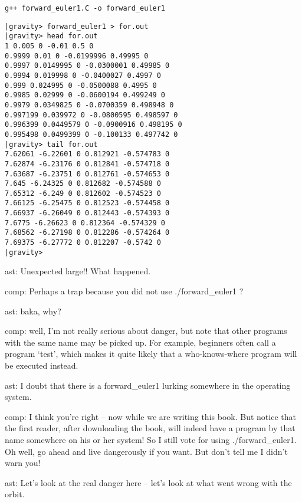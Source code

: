\documentclass{book}
\def\code#1{{\small}}
\begin{document}
\code{forward_euler1.C}

\begin{small}
\begin{verbatim}
g++ forward_euler1.C -o forward_euler1
\end{verbatim}
\end{small}

\begin{small}
\begin{verbatim}
|gravity> forward_euler1 > for.out
|gravity> head for.out
1 0.005 0 -0.01 0.5 0
0.9999 0.01 0 -0.0199996 0.49995 0
0.9997 0.0149995 0 -0.0300001 0.49985 0
0.9994 0.019998 0 -0.0400027 0.4997 0
0.999 0.024995 0 -0.0500088 0.4995 0
0.9985 0.02999 0 -0.0600194 0.499249 0
0.9979 0.0349825 0 -0.0700359 0.498948 0
0.997199 0.039972 0 -0.0800595 0.498597 0
0.996399 0.0449579 0 -0.0900916 0.498195 0
0.995498 0.0499399 0 -0.100133 0.497742 0
|gravity> tail for.out
7.62061 -6.22601 0 0.812921 -0.574783 0
7.62874 -6.23176 0 0.812841 -0.574718 0
7.63687 -6.23751 0 0.812761 -0.574653 0
7.645 -6.24325 0 0.812682 -0.574588 0
7.65312 -6.249 0 0.812602 -0.574523 0
7.66125 -6.25475 0 0.812523 -0.574458 0
7.66937 -6.26049 0 0.812443 -0.574393 0
7.6775 -6.26623 0 0.812364 -0.574329 0
7.68562 -6.27198 0 0.812286 -0.574264 0
7.69375 -6.27772 0 0.812207 -0.5742 0
|gravity>
\end{verbatim}
\end{small}

ast: Unexpected large!! What happened.

comp: Perhaps a trap because you did not use ./forward\_euler1 ?

ast: baka, why?

comp: well, I'm not really serious about danger, but note that other
programs with the same name may be picked up.  For example, beginners
often call a program `test', which makes it quite likely that a
who-knows-where program will be executed instead.

ast: I doubt that there is a forward\_euler1 lurking somewhere in the
operating system.

comp: I think you're right -- now while we are writing this book.  But
notice that the first reader, after downloading the book, will indeed
have a program by that name somewhere on his or her system!  So I
still vote for using ./forward\_euler1.  Oh well, go ahead and live
dangerously if you want.  But don't tell me I didn't warn you!

ast: Let's look at the real danger here -- let's look at what went
wrong with the orbit.
\end{document}
